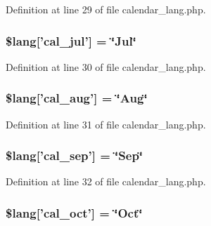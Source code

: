 Definition at line 29 of file calendar\-\_\-lang.\-php.

\hypertarget{calendar__lang_8php_a65585e0f8fda86a900ced005f0bb3c16}{
\subsubsection[{\$lang}]{\setlength{\rightskip}{0pt plus 5cm}\$lang\mbox{[}'cal\-\_\-jul'\mbox{]} = \char`\"{}Jul\char`\"{}}}\label{calendar__lang_8php_a65585e0f8fda86a900ced005f0bb3c16}


Definition at line 30 of file calendar\-\_\-lang.\-php.

\hypertarget{calendar__lang_8php_ab7a387970f84455d8f289020761aeb83}{
\subsubsection[{\$lang}]{\setlength{\rightskip}{0pt plus 5cm}\$lang\mbox{[}'cal\-\_\-aug'\mbox{]} = \char`\"{}Aug\char`\"{}}}\label{calendar__lang_8php_ab7a387970f84455d8f289020761aeb83}


Definition at line 31 of file calendar\-\_\-lang.\-php.

\hypertarget{calendar__lang_8php_a09ed21f8320998bf99f89cc5121a69b2}{
\subsubsection[{\$lang}]{\setlength{\rightskip}{0pt plus 5cm}\$lang\mbox{[}'cal\-\_\-sep'\mbox{]} = \char`\"{}Sep\char`\"{}}}\label{calendar__lang_8php_a09ed21f8320998bf99f89cc5121a69b2}


Definition at line 32 of file calendar\-\_\-lang.\-php.

\hypertarget{calendar__lang_8php_af4d1254dc312bf5e945d47d1011f35f7}{
\subsubsection[{\$lang}]{\setlength{\rightskip}{0pt plus 5cm}\$lang\mbox{[}'cal\-\_\-oct'\mbox{]} = \char`\"{}Oct\char`\"{}}}\label{calendar__lang_8php_af4d1254dc312bf5e945d47d1011f35f7}


